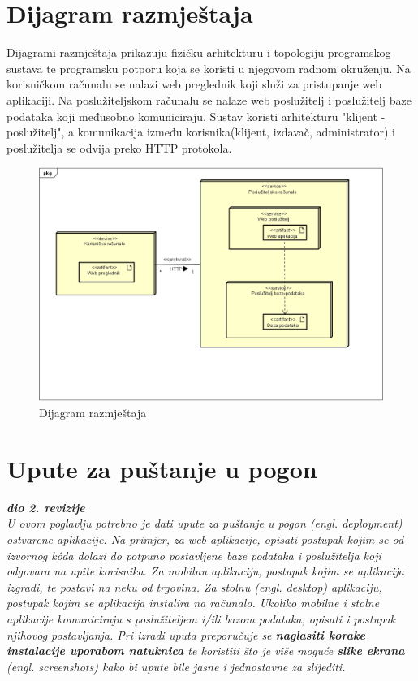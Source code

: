 			\eject 
		
		
		\section{Dijagram razmještaja}
			
			Dijagrami razmještaja prikazuju fizičku arhitekturu i topologiju programskog sustava te programsku potporu koja se koristi u njegovom radnom okruženju. Na korisničkom računalu se nalazi web preglednik koji služi za pristupanje web aplikaciji. Na poslužiteljskom računalu se nalaze web poslužitelj i poslužitelj baze podataka koji međusobno komuniciraju. Sustav koristi arhitekturu "klijent - poslužitelj", a komunikacija između korisnika(klijent, izdavač, administrator) i poslužitelja se odvija preko HTTP protokola.
			
			\begin{figure}[H]
				\includegraphics[width=\textwidth]{dijagrami/DijagramRazmjestaja.PNG} %
				\centering
				\caption{Dijagram razmještaja}
				\label{fig:diagrazmjestaja}
			\end{figure}
			
			
			\eject 
		
		\section{Upute za puštanje u pogon}
		
			\textbf{\textit{dio 2. revizije}}\\
		
			 \textit{U ovom poglavlju potrebno je dati upute za puštanje u pogon (engl. deployment) ostvarene aplikacije. Na primjer, za web aplikacije, opisati postupak kojim se od izvornog kôda dolazi do potpuno postavljene baze podataka i poslužitelja koji odgovara na upite korisnika. Za mobilnu aplikaciju, postupak kojim se aplikacija izgradi, te postavi na neku od trgovina. Za stolnu (engl. desktop) aplikaciju, postupak kojim se aplikacija instalira na računalo. Ukoliko mobilne i stolne aplikacije komuniciraju s poslužiteljem i/ili bazom podataka, opisati i postupak njihovog postavljanja. Pri izradi uputa preporučuje se \textbf{naglasiti korake instalacije uporabom natuknica} te koristiti što je više moguće \textbf{slike ekrana} (engl. screenshots) kako bi upute bile jasne i jednostavne za slijediti.}
			
